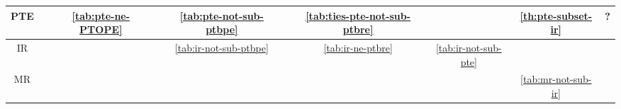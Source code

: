 \begin{sidewaystable}
\begin{tabular}{|c|c|c|c|c|c|c|c|c|c|}
		\hline
		PTE & \cellcolor{red!15} & \cellcolor{red!30} \autoref{tab:pte-ne-PTOPE} & \cellcolor{red!15} & \cellcolor{red!30} \autoref{tab:pte-not-sub-ptbpe} & \cellcolor{red!15} & \cellcolor{red!30} \autoref{tab:ties-pte-not-sub-ptbre} & \cellcolor{gray!30} & \cellcolor{green!30} \autoref{th:pte-subset-ir} & ? \\
		\hline
		IR & \cellcolor{red!15} & \cellcolor{red!15} & \cellcolor{red!15} & \cellcolor{red!30} \autoref{tab:ir-not-sub-ptbpe} & \cellcolor{red!15} & \cellcolor{red!30} \autoref{tab:ir-ne-ptbre} & \cellcolor{red!30} \autoref{tab:ir-not-sub-pte} & \cellcolor{gray!30} & \cellcolor{red!15} \\
		\hline
		MR & \cellcolor{red!15} & \cellcolor{red!15} & \cellcolor{red!15} & \cellcolor{red!15} & \cellcolor{red!15} & \cellcolor{red!15} & \cellcolor{red!15} & \cellcolor{red!30} \autoref{tab:mr-not-sub-ir} & \cellcolor{gray!30} \\
		\hline
		\end{tabular}
\end{sidewaystable}

